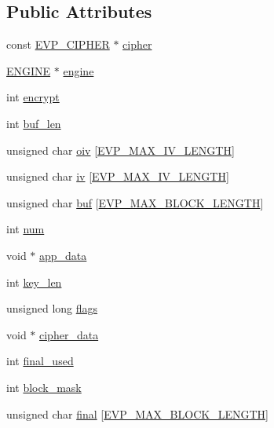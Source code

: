 \subsection*{Public Attributes}
\begin{DoxyCompactItemize}
\item 
const \hyperlink{ossl__typ_8h_a54a8663a8084d45c31f2786156b55405}{E\+V\+P\+\_\+\+C\+I\+P\+H\+ER} $\ast$ \hyperlink{structevp__cipher__ctx__st_a54860c2aa28ae69bff3ada58996b4bc3}{cipher}
\item 
\hyperlink{ossl__typ_8h_abac45b251498719318e60ab8d6192510}{E\+N\+G\+I\+NE} $\ast$ \hyperlink{structevp__cipher__ctx__st_a1ab6fb61a2574c641f9498c8731715d3}{engine}
\item 
int \hyperlink{structevp__cipher__ctx__st_ad6b7abc39f975d0d324be0fef7665cc6}{encrypt}
\item 
int \hyperlink{structevp__cipher__ctx__st_abf70e5abfb9df24c74ad2297c7d53ae0}{buf\+\_\+len}
\item 
unsigned char \hyperlink{structevp__cipher__ctx__st_a9b3a75184a5f5d29fbccf925503fe302}{oiv} \mbox{[}\hyperlink{evp_8h_a80893bc2dbae769441bf6a042cf4069e}{E\+V\+P\+\_\+\+M\+A\+X\+\_\+\+I\+V\+\_\+\+L\+E\+N\+G\+TH}\mbox{]}
\item 
unsigned char \hyperlink{structevp__cipher__ctx__st_a1b3aa9f85ae704113077fb77b5c9db8b}{iv} \mbox{[}\hyperlink{evp_8h_a80893bc2dbae769441bf6a042cf4069e}{E\+V\+P\+\_\+\+M\+A\+X\+\_\+\+I\+V\+\_\+\+L\+E\+N\+G\+TH}\mbox{]}
\item 
unsigned char \hyperlink{structevp__cipher__ctx__st_a433caab60fc2419a460e4006b0734352}{buf} \mbox{[}\hyperlink{evp_8h_a64ccdeff3fee6041507240b227ef3646}{E\+V\+P\+\_\+\+M\+A\+X\+\_\+\+B\+L\+O\+C\+K\+\_\+\+L\+E\+N\+G\+TH}\mbox{]}
\item 
int \hyperlink{structevp__cipher__ctx__st_ae09b6c40179528583d8d7b3cc623bd87}{num}
\item 
void $\ast$ \hyperlink{structevp__cipher__ctx__st_a00e9113f48a52bc9b1b95cc01a2560fa}{app\+\_\+data}
\item 
int \hyperlink{structevp__cipher__ctx__st_a61064bef0c7565f3509f8d48f253637d}{key\+\_\+len}
\item 
unsigned long \hyperlink{structevp__cipher__ctx__st_acc3a9b3a3e5a7ca498e3f5817ffc533f}{flags}
\item 
void $\ast$ \hyperlink{structevp__cipher__ctx__st_a9f5ecc2a2fb070546367e44efc1d2ce8}{cipher\+\_\+data}
\item 
int \hyperlink{structevp__cipher__ctx__st_a3cc687900b93b8cc130b52b0d5d9a836}{final\+\_\+used}
\item 
int \hyperlink{structevp__cipher__ctx__st_aaa51b6dbde049f6b51227aab31a9c21d}{block\+\_\+mask}
\item 
unsigned char \hyperlink{structevp__cipher__ctx__st_afe49879d0b4707382a3477ebb4eda55b}{final} \mbox{[}\hyperlink{evp_8h_a64ccdeff3fee6041507240b227ef3646}{E\+V\+P\+\_\+\+M\+A\+X\+\_\+\+B\+L\+O\+C\+K\+\_\+\+L\+E\+N\+G\+TH}\mbox{]}
\end{DoxyCompactItemize}


